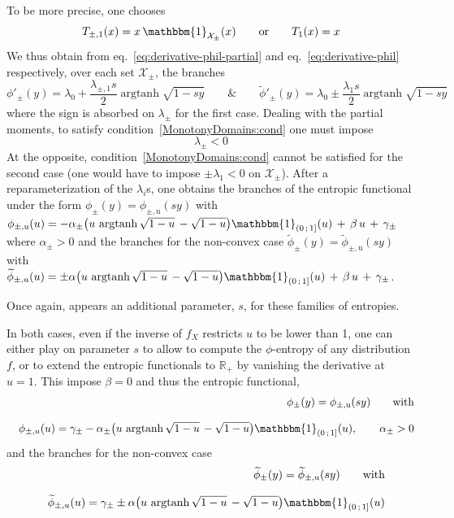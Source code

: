 \documentclass[entropy,article,submit,moreauthors,pdftex]{Definitions/mdpi}
\newcommand{\SZ}[1]{{\color{blue} #1}}                                       %
\def\Rset{\mathbb{R}}%
\def\X{\mathcal{X}}%
\def\un{\mathbbm{1}}%
\def\argtanh{\operatorname{argtanh}}%
\def\u{\mathrm{u}}
\begin{document}
\SZ{To be more precise, one chooses
%
\[
T_{\pm,1}(x) = x \, \un_{\X_\pm}(x) \qquad \mbox{or} \qquad T_1(x) = x
\]
%
We     thus    obtain     from    eq.~\eqref{eq:derivative-phil-partial}     and
eq.~\eqref{eq:derivative-phil}  respectively,   over  each  set   $\X_\pm$,  the
branches
%
\[
\phi'_\pm(y)  =  \lambda_0  +  \frac{\lambda_{\pm,1}  s}{2}  \argtanh\sqrt{1-sy}
\qquad \mbox{\&} \qquad \widetilde{\phi}'_\pm(y) = \lambda_0 \pm \frac{\lambda_1
  s}{2} \argtanh\sqrt{1-sy}
\]
%
where the sign is absorbed on $\lambda_\pm$ for the first case. Dealing with the
partial  moments,  to   satisfy  condition~\ref{MonotonyDomains:cond}  one  must
impose $$\lambda_\pm < 0$$ At the opposite, condition~\ref{MonotonyDomains:cond}
cannot be satisfied for the second case (one would have to impose $\pm \lambda_1
< 0$ on $\X_\pm$).  After a  reparameterization of the $\lambda_i$s, one obtains
the  branches  of  the  entropic   functional  under  the  form  $\phi_\pm(y)  =
\phi_{\pm,\u}(s  y)$  with   $\phi_{\pm,\u}(u)  =  -  \alpha_\pm   \left(  u  \,
\argtanh\sqrt{1-u} \, -  \sqrt{1-u} \right) \un_{\left( 0 \, ;  \, 1 \right]}(u)
\, + \, \beta  \, u \, + \, \gamma_\pm$ where $\alpha_\pm  > 0$ and the branches
for the  non-convex case $\widetilde{\phi}_\pm(y)  = \widetilde{\phi}_{\pm,\u}(s
y)$   with   $   \widetilde{\phi}_{\pm,u}(u)   =  \pm   \alpha   \left(   u   \,
\argtanh\sqrt{1-u} \, -  \sqrt{1-u} \right) \un_{\left( 0 \, ;  \, 1 \right]}(u)
  \, + \, \beta \, u \, + \, \gamma_\pm$.

Once  again,  appears  an  additional  parameter, $s$,  for  these  families  of
entropies.

In both cases,  even if the inverse of  $f_X$ restricts $u$ to be  lower than 1,
one can either play  on parameter $s$ to allow to  compute the $\phi$-entropy of
any distribution  $f$, or  to extend  the entropic  functionals to  $\Rset_+$ by
vanishing the  derivative at  $u =  1$.  This impose  $\beta =  0$ and  thus the
entropic functional,
%
\begin{eqnarray*}
  &&\phi_\pm(y)  =
  \phi_{\pm,\u}(s  y) \qquad \mbox{with}
  \\[2.5mm]
  && \phi_{\pm,u}(u)  =   \gamma_\pm -  \alpha_\pm  \left(   u  \,
  \argtanh\sqrt{1-u} \, -  \sqrt{1-u} \right) \un_{\left( 0 \, ;  \, 1 \right]}(u), \qquad \alpha_\pm  > 0
\end{eqnarray*}
%
and the branches for the non-convex case
%
\begin{eqnarray*}
  && \widetilde{\phi}_\pm(y)  = \widetilde{\phi}_{\pm,\u}(s
  y) \qquad \mbox{with}
  \\[2.5mm]
  &&\widetilde{\phi}_{\pm,u}(u)   =  \gamma_\pm \pm   \alpha   \left(   u   \,
  \argtanh\sqrt{1-u} \, -  \sqrt{1-u} \right) \un_{\left( 0 \, ;  \, 1 \right]}(u)
\end{eqnarray*}


}
\end{document}
